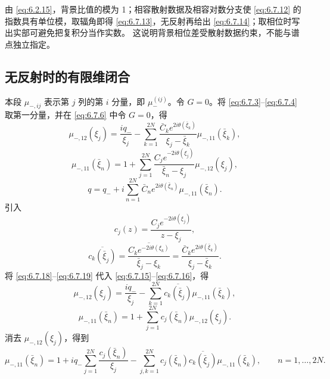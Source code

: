 \documentclass[lang=cn,scheme=chinese,mode=simple,device=normal,color=blue,
math=cm,thmcnt=section,12pt]{elegantbook}
\newcommand{\conj}[1]{\overline{#1}}
\newcommand{\eqq}[2]{\tag{#1}\label{eq:#1}#2}
\begin{document}
由 \eqref{eq:6.2.15}，背景比值的模为 1；相容散射数据及相容对数分支使 \eqref{eq:6.7.12} 的指数具有单位模，取辐角即得 \eqref{eq:6.7.13}，无反射再给出 \eqref{eq:6.7.14}；取相位时写出实部可避免把复积分当作实数。
这说明背景相位差受散射数据约束，不能与谱点独立指定。

\subsection{无反射时的有限维闭合}
本段 $\mu_{-,ij}$ 表示第 $j$ 列的第 $i$ 分量，即 $\mu_-^{(ij)}$。令 $G=0$。将 \eqref{eq:6.7.3}--\eqref{eq:6.7.4} 取第一分量，并在 \eqref{eq:6.7.6} 中令 $G=0$，得
\begin{equation}\eqq{6.7.15}{\mu_{-,12}(\xi_j)=\dfrac{iq_-}{\xi_j}
        -\sum\limits_{k=1}^{2N}\dfrac{\bar C_ke^{2i\theta(\bar\xi_k)}}{\xi_j-\bar\xi_k}\mu_{-,11}(\bar\xi_k),}\end{equation}
\begin{equation}\eqq{6.7.16}{\mu_{-,11}(\bar\xi_n)=1+\sum\limits_{j=1}^{2N}
        \dfrac{C_je^{-2i\theta(\xi_j)}}{\bar\xi_n-\xi_j}\mu_{-,12}(\xi_j),}\end{equation}
\begin{equation}\eqq{6.7.17}{q=q_-+i\sum\limits_{n=1}^{2N}\bar C_ne^{2i\theta(\bar\xi_n)}\mu_{-,11}(\bar\xi_n).}\end{equation}
引入
\begin{equation}\eqq{6.7.18}{c_j(z)=\dfrac{C_je^{-2i\theta(\xi_j)}}{z-\xi_j},}\end{equation}
\begin{equation}\eqq{6.7.19}{\conj{c_k(\bar\xi_j)}=
        \overline{\dfrac{C_ke^{-2i\theta(\xi_k)}}{\bar\xi_j-\xi_k}}
        =\dfrac{\bar C_ke^{2i\theta(\bar\xi_k)}}{\xi_j-\bar\xi_k}.}\end{equation}
将 \eqref{eq:6.7.18}--\eqref{eq:6.7.19} 代入 \eqref{eq:6.7.15}--\eqref{eq:6.7.16}，得
\begin{equation}\eqq{6.7.20}{\mu_{-,12}(\xi_j)=\dfrac{iq_-}{\xi_j}
        -\sum\limits_{k=1}^{2N}\conj{c_k(\bar\xi_j)}\mu_{-,11}(\bar\xi_k),}\end{equation}
\begin{equation}\eqq{6.7.21}{\mu_{-,11}(\bar\xi_n)=1+\sum\limits_{j=1}^{2N}c_j(\bar\xi_n)\mu_{-,12}(\xi_j).}\end{equation}
消去 $\mu_{-,12}(\xi_j)$，得到
\begin{equation}
    \eqq{6.7.22}{\mu_{-,11}(\bar\xi_n)=1+iq_-\sum\limits_{j=1}^{2N}\dfrac{c_j(\bar\xi_n)}{\xi_j}
        -\sum\limits_{j,k=1}^{2N}c_j(\bar\xi_n)\conj{c_k(\bar\xi_j)}\mu_{-,11}(\bar\xi_k),\qquad n=1,\ldots,2N.}
\end{equation}
\end{document}
